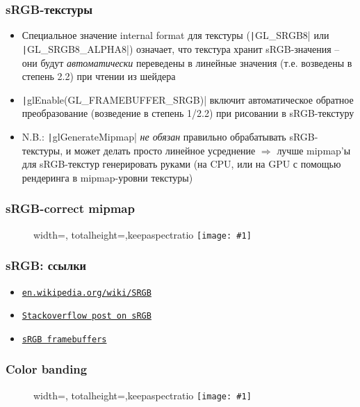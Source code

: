 \documentclass[10pt]{beamer}
\newcommand{\slideimage}[1]{
  \begin{figure}
    \begin{adjustbox}{width=\textwidth, totalheight=\textheight-2\baselineskip-2\baselineskip,keepaspectratio}
      \texttt{[image: \#1]}
    \end{adjustbox}
  \end{figure}
}
\begin{document}
\begin{frame}[fragile]
\frametitle{sRGB-текстуры}
\begin{itemize}
\item Специальное значение internal format для текстуры (\texttt|GL_SRGB8| или \texttt|GL_SRGB8_ALPHA8|) означает, что текстура хранит sRGB-значения -- они будут \textit{автоматически} переведены в линейные значения (т.е. возведены в степень 2.2) при чтении из шейдера
\pause
\item \texttt|glEnable(GL_FRAMEBUFFER_SRGB)| включит автоматическое обратное преобразование (возведение в степень 1/2.2) при рисовании в sRGB-текстуру
\pause
\item {\color{red}N.B.:} \texttt|glGenerateMipmap| \textit{не обязан} правильно обрабатывать sRGB-текстуры, и может делать просто линейное усреднение \begin{math}\Longrightarrow\end{math} лучше mipmap'ы для sRGB-текстур генерировать руками (на CPU, или на GPU с помощью рендеринга в mipmap-уровни текстуры)
\end{itemize}
\end{frame}

\begin{frame}[fragile]
\frametitle{sRGB-correct mipmap}
\slideimage{srgb-mipmap.png}
\end{frame}

\begin{frame}[fragile]
\frametitle{sRGB: ссылки}
\begin{itemize}
\item \href{https://en.wikipedia.org/wiki/SRGB}{\texttt{en.wikipedia.org/wiki/SRGB}}
\item \href{https://stackoverflow.com/a/12894053/2315602}{\texttt{Stackoverflow post on sRGB}}
\item \href{https://www.khronos.org/opengl/wiki/Framebuffer#Colorspace}{\texttt{sRGB framebuffers}}
\end{itemize}
\end{frame}

\begin{frame}[fragile]
\frametitle{Color banding}
\slideimage{banding.jpg}
\end{frame}
\end{document}
